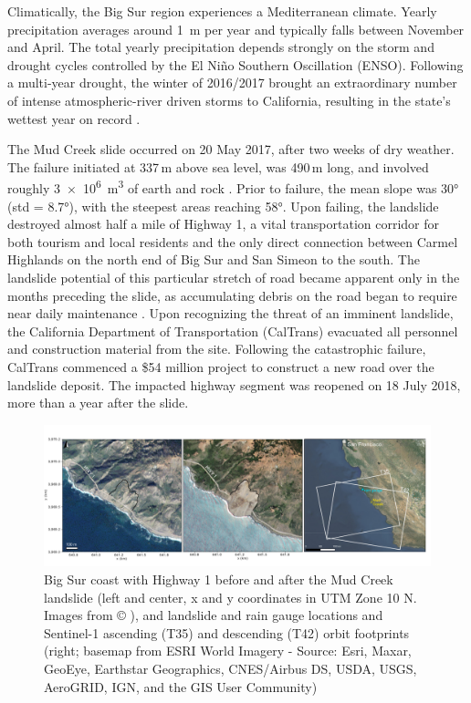 \documentclass[nhess, manuscript]{copernicus}
\begin{document}
Climatically, the Big Sur region experiences a Mediterranean climate. Yearly precipitation averages around \SI{1}{\meter} per year and typically falls between November and April. The total yearly precipitation depends strongly on the storm and drought cycles controlled by the El Niño Southern Oscillation (ENSO). Following a multi-year drought, the winter of 2016/2017 brought an extraordinary number of intense atmospheric-river driven storms to California, resulting in the state's wettest year on record \citep{swain2018}. 

\par The Mud Creek slide occurred on 20 May 2017, after two weeks of dry weather. The failure initiated at  337\,m above sea level, was 490\,m long, and involved roughly \SI{3e6}{\cubic\meter} of earth and rock \citep{warrick2019}. Prior to failure, the mean slope was \ang{30} (std = \ang{8.7}), with the steepest areas reaching \ang{58}. Upon failing, the landslide destroyed almost half a mile of Highway 1, a vital transportation corridor for both tourism and local residents and the only direct connection between Carmel Highlands on the north end of Big Sur and San Simeon to the south. The landslide potential of this particular stretch of road became apparent only in the months preceding the slide, as accumulating debris on the road began to require near daily maintenance \citep{warrick2019}. Upon recognizing the threat of an imminent landslide, the California Department of Transportation (CalTrans) evacuated all personnel and construction material from the site. Following the catastrophic failure, CalTrans commenced a \$54 million project to construct a new road over the landslide deposit. The impacted highway segment was reopened on 18 July 2018, more than a year after the slide.\par



\begin{figure}[hbt!]
    \centering
    \includegraphics[width = \textwidth]{OverviewFigure_2.pdf}
    \caption{Big Sur coast with Highway 1 before and after the Mud Creek landslide (left and center, x and y coordinates in UTM Zone 10 N. Images from © \cite{planetteam2017}), and landslide and rain gauge locations and Sentinel-1 ascending (T35) and descending (T42) orbit footprints (right; basemap from ESRI World Imagery - Source: Esri, Maxar, GeoEye, Earthstar Geographics, CNES/Airbus DS, USDA, USGS, AeroGRID, IGN, and the GIS User Community)}
    \label{fig:overview}
\end{figure}
\end{document}
